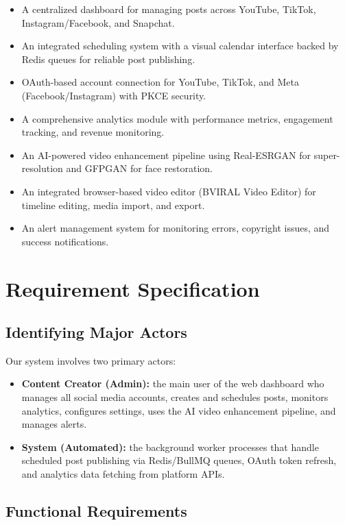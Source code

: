 \begin{itemize}
    \item A centralized dashboard for managing posts across YouTube, TikTok, Instagram/Facebook, and Snapchat.
    \item An integrated scheduling system with a visual calendar interface backed by Redis queues for reliable post publishing.
    \item OAuth-based account connection for YouTube, TikTok, and Meta (Facebook/Instagram) with PKCE security.
    \item A comprehensive analytics module with performance metrics, engagement tracking, and revenue monitoring.
    \item An AI-powered video enhancement pipeline using Real-ESRGAN for super-resolution and GFPGAN for face restoration.
    \item An integrated browser-based video editor (BVIRAL Video Editor) for timeline editing, media import, and export.
    \item An alert management system for monitoring errors, copyright issues, and success notifications.
\end{itemize}

\section{Requirement Specification}

\subsection{Identifying Major Actors}

Our system involves two primary actors:

\begin{itemize}
    \item \textbf{Content Creator (Admin):} the main user of the web dashboard who manages all social media accounts, creates and schedules posts, monitors analytics, configures settings, uses the AI video enhancement pipeline, and manages alerts.
    \item \textbf{System (Automated):} the background worker processes that handle scheduled post publishing via Redis/BullMQ queues, OAuth token refresh, and analytics data fetching from platform APIs.
\end{itemize}

\subsection{Functional Requirements}

